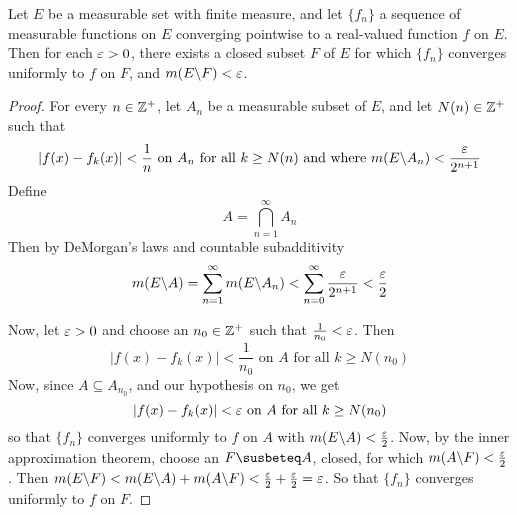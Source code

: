 \begin{theorem}\label{9.3.2}
    Let $E$ be a measurable set with finite measure, and let  $\{f_n\}$ a
    sequence of measurable functions on $E$ converging pointwise to a real-valued
    function  $f$ on $E$. Then for each $\varepsilon>0$, there exists a closed subset $F$
    of $E$ for which $\{f_n\}$ converges uniformly to $f$ on $F$, and
    $m(E \backslash F)<\varepsilon$.
\end{theorem}
\begin{proof}
    For every $n \in \mathbb{Z}^+$, let $A_n$ be a measurable subset of $E$, and let
    $N(n) \in \mathbb{Z}^+$ such that
    \begin{equation*}
        |f(x)-f_k(x)|<\frac{1}{n} \text{ on } A_n \text{ for all } k \geq N(n)
        \text{ and where } m(E \backslash A_n)<\frac{\varepsilon}{2^{n+1}}
    \end{equation*}
    Define
    \begin{equation*}
        A=\bigcap_{n=1}^\infty{A_n}
    \end{equation*}
    Then by DeMorgan's laws and countable subadditivity
    \begin{equation*}
        m(E \backslash A)=\sum_{n=1}^\infty{m(E \backslash A_n)}<
        \sum_{n=0}^\infty{\frac{\varepsilon}{2^{n+1}}}<\frac{\varepsilon}{2}
    \end{equation*}

    Now, let $\varepsilon>0$ and choose an $n_0 \in \mathbb{Z}^+$ such that $\frac{1}{n_0}<\varepsilon$.
    Then
    \begin{equation*}
        |f(x)-f_k(x)|<\frac{1}{n_0} \text{ on } A \text{ for all } k \geq N(n_0)
    \end{equation*}
    Now, since $A \subseteq A_{n_0}$, and our hypothesis on $n_0$, we get
    \begin{equation*}
        |f(x)-f_k(x)|<\varepsilon \text{ on } A \text{ for all } k \geq N(n_0)
    \end{equation*}
    so that $\{f_n\}$ converges uniformly to $f$ on  $A$ with
    $m(E \backslash A)<\frac{\varepsilon}{2}$. Now, by the inner approximation theorem,
    choose an $F \susbeteq A$, closed, for which  $m(A \backslash F)<\frac{\varepsilon}{2}$.
    Then
    $m(E \backslash F)<m(E \backslash A)+m(A \backslash F)<\frac{\varepsilon}{2}+\frac{\varepsilon}{2}=\varepsilon$. So
    that $\{f_n\}$ converges uniformly to $f$ on  $F$.
\end{proof}

